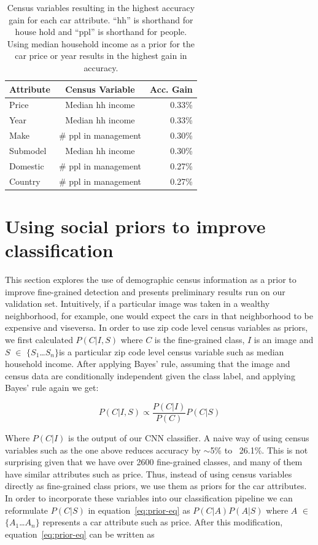 \documentclass[10pt,twocolumn,letterpaper]{article}
\begin{document}
\begin{table}
\begin{center}
\begin{tabular}{|l|c|r|}
\hline
\textbf{Attribute} & \textbf{Census Variable}& \textbf{Acc. Gain}\\
\hline\hline
Price & Median hh income & 0.33\%\\
Year  & Median hh income & 0.33\%\\
Make & \#  ppl in management & 0.30\%\\
Submodel & Median hh income & 0.30\%\\
Domestic & \# ppl in management & 0.27\%\\
Country & \# ppl in management & 0.27\%\\
\hline
\end{tabular}
\end{center}
\caption{Census variables resulting in the highest accuracy gain for each car attribute. ``hh'' is shorthand for house hold and ``ppl'' is shorthand for people. Using median household income as a prior for the car price or year results in the highest gain in accuracy.}
\label{table:prior-acc}
\end{table}

\section{Using social priors to improve classification}
\label{sec:prior}
This section explores the use of demographic census information as a prior to improve fine-grained detection and presents preliminary results run on our validation set. Intuitively, if a particular image was taken in a wealthy neighborhood, for example, one would expect the cars in that neighborhood to be expensive and viseversa. In order to use zip code level census variables as priors, we first calculated \(P(C|I,S)\) where \(C\) is the fine-grained class, \(I\) is an image and \(S\) \(\in\) \(\{\)\(S_{1}\)\ldots \(S_{n}\)\(\}\)is a particular zip code level census variable such as median household income. After applying Bayes' rule, assuming that the image and census data are conditionally independent given the class label, and applying Bayes' rule again we get:

\begin{equation}
P(C|I,S)\propto \frac{P(C|I)}{P(C)}P(C|S)
\label{eq:prior-eq}
\end{equation}

Where \(P(C|I)\) is the output of our CNN classifier. A naive way of using census variables such as the one above reduces accuracy by \(\sim\)5\% to ~26.1\%. This is not surprising given that we have over 2600 fine-grained classes, and many of them have similar attributes such as price. Thus, instead of using census variables directly as fine-grained class priors, we use them as priors for the car attributes. In order to incorporate these variables into our classification pipeline we can reformulate \(P(C|S)\) in equation~\ref{eq:prior-eq} as \(P(C|A)\)\(P(A|S)\) where \(A\) \(\in\) \(\{\)\(A_{1}\)\ldots\(A_{n}\)\(\}\) represents a car attribute such as price. After this modification, equation~\ref{eq:prior-eq} can be written as  
\end{document}
